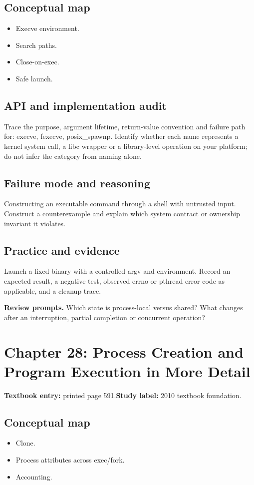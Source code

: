 \documentclass[11pt,letterpaper,oneside]{report}
\begin{document}
\subsection{Conceptual map}
\begin{itemize}
\item Execve environment.
\item Search paths.
\item Close-on-exec.
\item Safe launch.
\end{itemize}
\subsection{API and implementation audit}
Trace the purpose, argument lifetime, return-value convention and failure path for: execve, fexecve, posix\_spawnp. Identify whether each name represents a kernel system call, a libc wrapper or a library-level operation on your platform; do not infer the category from naming alone.

\subsection{Failure mode and reasoning}
Constructing an executable command through a shell with untrusted input. Construct a counterexample and explain which system contract or ownership invariant it violates.

\subsection{Practice and evidence}
Launch a fixed binary with a controlled argv and environment. Record an expected result, a negative test, observed errno or pthread error code as applicable, and a cleanup trace.

\textbf{Review prompts.} Which state is process-local versus shared? What changes after an interruption, partial completion or concurrent operation?

\section{Chapter 28: Process Creation and Program Execution in More Detail}
\textbf{Textbook entry:} printed page 591.\quad \textbf{Study label:} 2010 textbook foundation.

\subsection{Conceptual map}
\begin{itemize}
\item Clone.
\item Process attributes across exec/fork.
\item Accounting.
\end{itemize}
\end{document}
